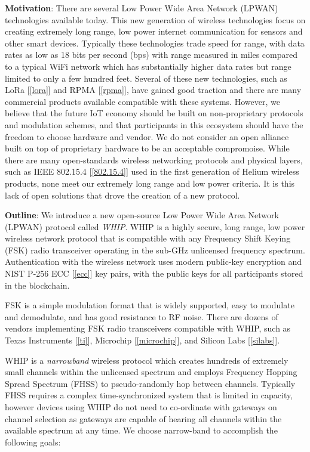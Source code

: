 \documentclass[letterpaper,11pt]{article}
\begin{document}
\textbf{Motivation}: There are several Low Power Wide Area Network (LPWAN) technologies available today. This new generation of wireless technologies focus on creating extremely long range, low power internet communication for sensors and other smart devices. Typically these technologies trade speed for range, with data rates as low as 18 bits per second (bps) with range measured in miles compared to a typical WiFi network which has substantially higher data rates but range limited to only a few hundred feet. Several of these new technologies, such as LoRa [\ref{lora}] and RPMA [\ref{rpma}], have gained good traction and there are many commercial products available compatible with these systems. However, we believe that the future IoT economy should be built on non-proprietary protocols and modulation schemes, and that participants in this ecosystem should have the freedom to choose hardware and vendor. We do not consider an open alliance built on top of proprietary hardware to be an acceptable compromoise. While there are many open-standards wireless networking protocols and physical layers, such as IEEE 802.15.4 [\ref{802.15.4}] used in the first generation of Helium wireless products, none meet our extremely long range and low power criteria. It is this lack of open solutions that drove the creation of a new protocol.\newline

\textbf{Outline}: We introduce a new open-source Low Power Wide Area Network (LPWAN) protocol called \emph{WHIP}. WHIP is a highly secure, long range, low power wireless network protocol that is compatible with any Frequency Shift Keying (FSK) radio transceiver operating in the sub-GHz unlicensed frequency spectrum. Authentication with the wireless network uses modern public-key encryption and NIST P-256 ECC [\ref{ecc}] key pairs, with the public keys for all participants stored in the blockchain.\newline

FSK is a simple modulation format that is widely supported, easy to modulate and demodulate, and has good resistance to RF noise. There are dozens of vendors implementing FSK radio transceivers compatible with WHIP, such as Texas Instruments [\ref{ti}], Microchip [\ref{microchip}], and Silicon Labs [\ref{silabs}].\newline

WHIP is a \emph{narrowband} wireless protocol which creates hundreds of extremely small channels within the unlicensed spectrum and employs Frequency Hopping Spread Spectrum (FHSS) to pseudo-randomly hop between channels. Typically FHSS requires a complex time-synchronized system that is limited in capacity, however devices using WHIP do not need to co-ordinate with gateways on channel selection as gateways are capable of hearing all channels within the available spectrum at any time. We choose narrow-band to accomplish the following goals:
\end{document}
